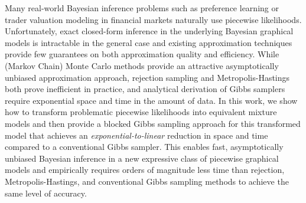 Many real-world Bayesian inference problems such as preference
learning or trader valuation modeling in financial markets naturally
use piecewise likelihoods.  Unfortunately, exact closed-form inference
in the underlying Bayesian graphical models is intractable in the
general case and existing approximation techniques provide few
guarantees on both approximation quality and efficiency.  While
(Markov Chain) Monte Carlo methods provide an attractive
asymptotically unbiased approximation approach, rejection sampling and
Metropolis-Hastings both prove inefficient in practice, and analytical
derivation of Gibbs samplers require exponential space and time in the
amount of data.  In this work, we show how to transform problematic
piecewise likelihoods into equivalent mixture models and then provide
a blocked Gibbs sampling approach for this transformed model that
achieves an \emph{exponential-to-linear} reduction in space and time compared
to a conventional Gibbs sampler.  This enables fast, asymptotically
unbiased Bayesian inference in a new expressive class of piecewise graphical
models and empirically requires orders of magnitude less time than
rejection, Metropolis-Hastings, and conventional Gibbs sampling
methods to achieve the same level of accuracy.

